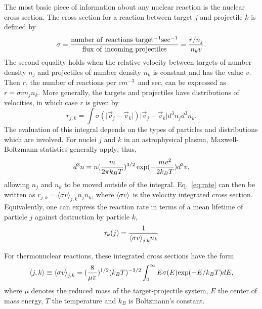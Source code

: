 \documentclass[12pt,modern,tighten,times,apj]{aastex61}
\newcommand{\sigv}{{\ensuremath{\langle \sigma v \rangle}}}
\begin{document}
The most basic piece of information about any nuclear reaction is the nuclear cross section.  
The cross section for a reaction between target $j$ and projectile $k$ is defined by 
\begin{equation}
    \sigma = {\rm{number\ of\ reactions\ target^{-1} sec^{-1}} \over
    {flux\ of\ incoming\ projectiles}} = {{r/n_j} \over {n_k v}}. 
    \label{eq:sigma}
\end{equation}
The second equality holds when the relative velocity between targets of number density $n_j$ and projectiles of number density $n_k$ is constant and has the value $v$.  
Then $r$, the number of reactions per $cm^{-3}$\ and sec, can be expressed as $r=\sigma v n_j n_k$.  
More generally, the targets and projectiles have distributions of velocities, in which case $r$ is given by
\begin{equation}
    r_{j,k}=\int \sigma (\vert \vec v_j -\vec v_k\vert) \vert \vec v_j 
    -\vec v_k\vert d^3 n_j d^3 n_k.
    \label{eq:rate}
\end{equation}
The evaluation of this integral depends on the types of particles and distributions which are involved. For nuclei $j$ and $k$ in an astrophysical plasma, Maxwell-Boltzmann statistics generally apply; thus,
\begin{equation}
    d^3n=n ({{m} \over {2\pi k_B T}})^{3/2} \exp (-{{mv^2} \over {2 k_B T}}) d^3v,
\end{equation}
allowing $n_j$ and $n_k$ to be moved outside of the integral.  
Eq.~\ref{eq:rate} can then be written as $r_{j,k}=\sigv_{j,k} n_j n_k$, where \sigv\ is the velocity integrated cross section.  
Equivalently, one can express the reaction rate in terms of a mean lifetime of particle $j$ against destruction by particle $k$, 
\begin{equation}
    \tau_{k}(j)= {1 \over {\sigv_{j,k} n_{k}}}
    \label{eq:tau}
\end{equation}

For thermonuclear reactions, these integrated cross sections have the form \cite{Clay83,FoCZ67}
\begin{equation}
    \langle j,k \rangle \equiv \sigv_{j,k}= ({8 \over {\mu \pi}})^{1/2} 
    (k_B T)^{-3/2} \int_0 ^\infty E \sigma (E) {\rm exp}(-E/k_B T) dE, 
    \label{eq:sigv}
\end{equation}
where $\mu$ denotes the reduced mass of the target-projectile system, $E$ the center of mass energy, $T$ the temperature and $k_{B}$ is Boltzmann's constant.
\end{document}
